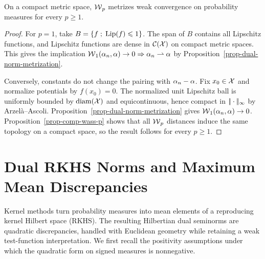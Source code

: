 \begin{cor}\label{cor-topol-wass}
	On a compact metric space, $\operatorname{\mathcal{W}}_p$ metrizes weak convergence on probability measures for every $p\geq1$.
\end{cor}
\begin{proof}
	For $p=1$, take $B=\left\{ f \;;\; \operatorname{Lip}(f)\leqslant1 \right\}$. The span of $B$ contains all Lipschitz functions, and Lipschitz functions are dense in $\mathcal{C}(\mathcal{X})$ on compact metric spaces. This gives the implication $\operatorname{\mathcal{W}}_1(\alpha_n,\alpha)\to0\Rightarrow \alpha_n\rightharpoonup\alpha$ by Proposition~\ref{prop-dual-norm-metrization}.

	Conversely, constants do not change the pairing with $\alpha_n-\alpha$. Fix $x_0\in\mathcal{X}$ and normalize potentials by $f(x_0)=0$. The normalized unit Lipschitz ball is uniformly bounded by $\mathrm{diam}(\mathcal{X})$ and equicontinuous, hence compact in $|\!| \cdot |\!|_\infty$ by Arzel\`a--Ascoli. Proposition~\ref{prop-dual-norm-metrization} gives $\operatorname{\mathcal{W}}_1(\alpha_n,\alpha)\to0$. Proposition~\ref{prop-comp-wass-p} shows that all $\operatorname{\mathcal{W}}_p$ distances induce the same topology on a compact space, so the result follows for every $p\geq1$.
\end{proof}

\section{Dual RKHS Norms and Maximum Mean Discrepancies}
\label{sec-rkhs-mmd}

Kernel methods turn probability measures into mean elements of a reproducing kernel Hilbert space (RKHS). The resulting Hilbertian dual seminorms are quadratic discrepancies, handled with Euclidean geometry while retaining a weak test-function interpretation. We first recall the positivity assumptions under which the quadratic form on signed measures is nonnegative.


